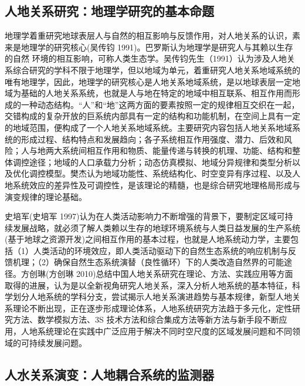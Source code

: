 
\subsection{人地关系研究：地理学研究的基本命题}

地理学着重研究地球表层人与自然的相互影响与反馈作用，对人地关系的认识，素来是地理学的研究核心(吴传钧 1991)。巴罗斯认为地理学是研究人与其赖以生存的自然 环境的相互影响，可称人类生态学。吴传钧先生（1991）认为涉及人地关系综合研究的学科不限于地理学，但以地域为单元，着重研究人地关系地域系统的唯有地理学，因此，地理学的研究核心是人地关系地域系统，是以地球表层一定地域为基础的人地关系系统，也就是人与地在特定的地域中相互联系、相互作用而形成的一种动态结构。“人”和“地”这两方面的要素按照一定的规律相互交织在一起，交错构成的复杂开放的巨系统内部具有一定的结构和功能机制，在空间上具有一定的地域范围，便构成了一个人地关系地域系统。主要研究内容包括人地关系地域系统的形成过程、结构特点和发展趋向；各子系统相互作用强度、潜力、后效和风险；人与地两大系统间相互作用和物质、能量传递与转换的机理、功能、结构和整体调控途径；地域的人口承载力分析；动态仿真模拟、地域分异规律和类型分析以及优化调控模型。樊杰认为地域功能性、系统结构化、时空变异有序过程、以及人地系统效应的差异性及可调控性，是该理论的精髓，也是综合研究地理格局形成与演变规律的理论基础。

史培军(史培军 1997)认为在人类活动影响力不断增强的背景下，要制定区域可持续发展战略，就必须了解人类赖以生存的地球环境系统与人类日益发展的生产系统 (基于地球之资源开发)之间相互作用的基本过程，也就是人地系统动力学，主要包括（1）人类活动的环境效应，即人类活动驱动下的自然生态系统的响应机制与反馈机理；（2）确保自然生态系统演替（良性循环）下的人类改造自然界的可能途径。方创琳(方创琳 2010)总结中国人地关系研究在理论、方法、实践应用等方面取得的进展，认为是以全新视角研究人地关系，深入分析人地系统的基本特征，科学划分人地系统的学科分支，尝试揭示人地关系演进趋势与基本规律，新型人地关系理论不断出现，正在逐步形成理论体系，人地系统研究方法趋于多元化，定性研究方法、数学模拟方法、3S 技术方法和综合集成方法等新方法与新手段不断应用，人地系统理论在实践中广泛应用于解决不同时空尺度的区域发展问题和不同领域的可持续发展问题。

\subsection{人水关系演变：人地耦合系统的监测器}

